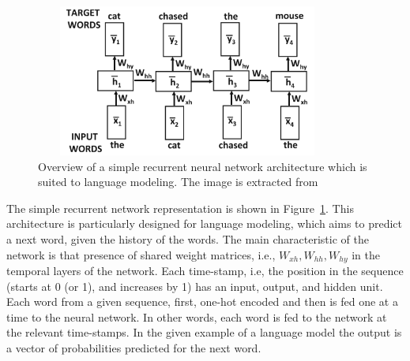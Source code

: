 \begin{figure}[h]
\centering
 \includegraphics[height=5cm, width=10cm]{Figures/fig_rnn.png}
 \caption{Overview of a simple recurrent neural network architecture which is suited to language modeling. The image is extracted from~\cite{DBLP:books/sp/Aggarwal18}}
 \label{fig:rnn}
\end{figure}


The simple recurrent network representation is shown in Figure~\ref{fig:rnn}. This architecture is particularly designed for language modeling, which aims to predict a next word, given the history of the words. The main characteristic of the network is that presence of shared weight matrices, i.e., $W_{xh}, W_{hh}, W_{hy}$ in the temporal layers of the network. Each time-stamp, i.e, the position in the sequence (starts at 0 (or 1), and increases by 1) has an input,
output, and hidden unit. Each word from a given sequence, first, one-hot encoded and then is fed one at a time to the neural network. In other words, each word is fed to the network at the relevant time-stamps.
In the given example of a language model the output is a vector of probabilities predicted for the next word. %

